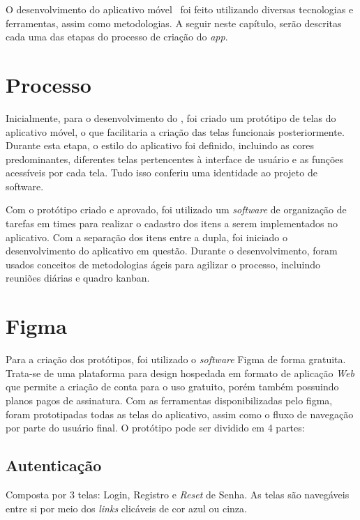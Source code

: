 O desenvolvimento do aplicativo móvel \appName\ foi feito utilizando diversas tecnologias e ferramentas, assim como metodologias. A seguir neste capítulo, serão descritas cada uma das etapas do processo de criação do \textit{app}.

\section{Processo}

Inicialmente, para o desenvolvimento do \appName, foi criado um protótipo de telas do aplicativo móvel, o que facilitaria a criação das telas funcionais posteriormente. Durante esta etapa, o estilo do aplicativo foi definido, incluindo as cores predominantes, diferentes telas pertencentes à interface de usuário e as funções acessíveis por cada tela. Tudo isso conferiu uma identidade ao projeto de software.

Com o protótipo criado e aprovado, foi utilizado um \textit{software} de organização de tarefas em times para realizar o cadastro dos itens a serem implementados no aplicativo. Com a separação dos itens entre a dupla, foi iniciado o desenvolvimento do aplicativo em questão. Durante o desenvolvimento, foram usados conceitos de metodologias ágeis para agilizar o processo, incluindo reuniões diárias e quadro kanban.

\section{Figma}

Para a criação dos protótipos, foi utilizado o \textit{software} Figma de forma gratuita. Trata-se de uma plataforma para design hospedada em formato de aplicação \textit{Web} que permite a criação de conta para o uso gratuito, porém também possuindo planos pagos de assinatura. Com as ferramentas disponibilizadas pelo figma, foram prototipadas todas as telas do aplicativo, assim como o fluxo de navegação por parte do usuário final. O protótipo pode ser dividido em 4 partes:

\subsection{Autenticação}

Composta por 3 telas: Login, Registro e \textit{Reset} de Senha. As telas são navegáveis entre si por meio dos \textit{links} clicáveis de cor azul ou cinza.


